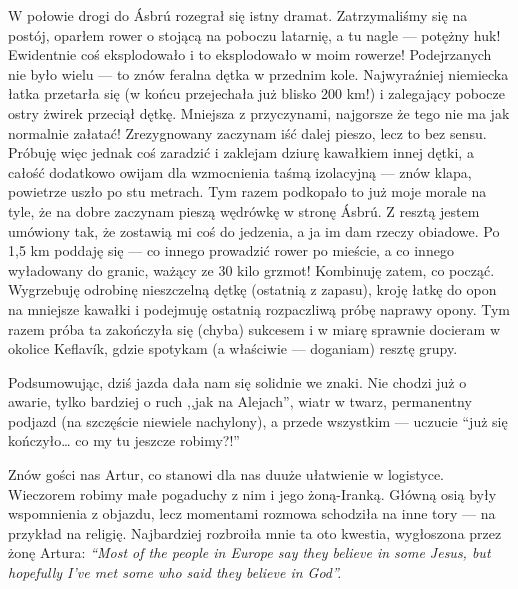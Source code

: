 W połowie drogi do Ásbrú rozegrał się istny dramat. Zatrzymaliśmy się na postój, oparłem rower o stojącą na poboczu latarnię, a tu nagle --- potężny huk! Ewidentnie coś eksplodowało i to eksplodowało w moim rowerze! Podejrzanych nie było wielu --- to znów feralna dętka w przednim kole. Najwyraźniej niemiecka łatka przetarła się (w końcu przejechała już blisko 200 km!) i zalegający pobocze ostry żwirek przeciął dętkę. Mniejsza z przyczynami, najgorsze że tego nie ma jak normalnie załatać! Zrezygnowany zaczynam iść dalej pieszo, lecz to bez sensu. Próbuję więc jednak coś zaradzić i zaklejam dziurę kawałkiem innej dętki, a całość dodatkowo owijam dla wzmocnienia taśmą izolacyjną --- znów klapa, powietrze uszło po stu metrach. Tym razem podkopało to już moje morale na tyle, że na dobre zaczynam pieszą wędrówkę w stronę Ásbrú. Z resztą jestem umówiony tak, że zostawią mi coś do jedzenia, a ja im dam rzeczy obiadowe. Po 1,5 km poddaję się --- co innego prowadzić rower po mieście, a co innego wyładowany do granic, ważący ze 30 kilo grzmot! Kombinuję zatem, co począć. Wygrzebuję odrobinę nieszczelną dętkę (ostatnią z zapasu), kroję łatkę do opon na mniejsze kawałki i podejmuję ostatnią rozpaczliwą próbę naprawy opony. Tym razem próba ta zakończyła się (chyba) sukcesem i w miarę sprawnie docieram w okolice Keflavík, gdzie spotykam (a właściwie --- doganiam) resztę grupy.

Podsumowując, dziś jazda dała nam się solidnie we znaki. Nie chodzi już o awarie, tylko bardziej o ruch ,,jak na Alejach'', wiatr w twarz, permanentny podjazd (na szczęście niewiele nachylony), a przede wszystkim --- uczucie “już się kończyło… co my tu jeszcze robimy?!”

Znów gości nas Artur, co stanowi dla nas duuże ułatwienie w logistyce. Wieczorem robimy małe pogaduchy z nim i jego żoną-Iranką. Główną osią były wspomnienia z objazdu, lecz momentami rozmowa schodziła na inne tory --- na przykład na religię. Najbardziej rozbroiła mnie ta oto kwestia, wygłoszona przez żonę Artura: \emph{“Most of the people in Europe say they believe in some Jesus, but hopefully I’ve met some who said they believe in God”.}

